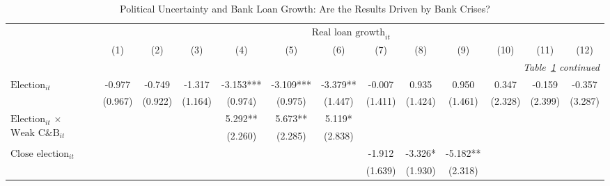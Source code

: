 \begin{longtable}{m{4cm}*{12}{c}}                                         \caption{Political Uncertainty and Bank Loan Growth: Are the Results Driven by Bank Crises?\label{robustcrises2loans}}\\                                         \toprule                                         &\multicolumn{12}{c}{$\text{Real loan growth}_{it}$} \\ \cmidrule(lr){2-13}
                    &         (1)   &         (2)   &         (3)   &         (4)   &         (5)   &         (6)   &         (7)   &         (8)   &         (9)   &        (10)   &        (11)   &        (12)   \\
\midrule\endfirsthead                                         \multicolumn{13}{r}{\textit{Table~\ref{robustcrises2loans} continued}} \\                                         \toprule\endhead\midrule\endfoot\endlastfoot
$\text{Election}_{it}$&      -0.977   &      -0.749   &      -1.317   &      -3.153***&      -3.109***&      -3.379** &      -0.007   &       0.935   &       0.950   &       0.347   &      -0.159   &      -0.357   \\
                    &     (0.967)   &     (0.922)   &     (1.164)   &     (0.974)   &     (0.975)   &     (1.447)   &     (1.411)   &     (1.424)   &     (1.461)   &     (2.328)   &     (2.399)   &     (3.287)   \\
\multirow{2}{4cm}{$\text{Election}_{it}$ $\times$ $\text{Weak C\&B}_{it}$}&               &               &               &       5.292** &       5.673** &       5.119*  &               &               &               &               &               &               \\
                    &               &               &               &     (2.260)   &     (2.285)   &     (2.838)   &               &               &               &               &               &               \\
\multirow{2}{4cm}{$\text{Close election}_{it}$}&               &               &               &               &               &               &      -1.912   &      -3.326*  &      -5.182** &               &               &               \\
                    &               &               &               &               &               &               &     (1.639)   &     (1.930)   &     (2.318)   &               &               &               \\

\end{longtable}
